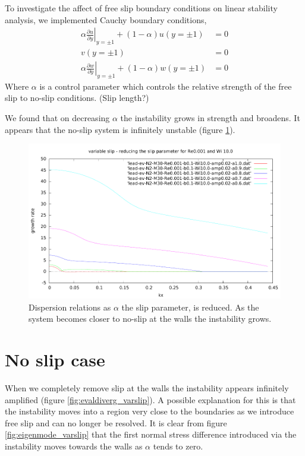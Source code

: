 \documentclass{jfm}
\newcommand{\dy}[1]{\frac{\partial #1}{\partial y}}
\begin{document}
To investigate the affect of free slip boundary conditions on linear stability analysis, we implemented Cauchy boundary conditions,
\begin{align}
    \alpha\left.\dy{u}\right|_{y=\pm1} + (1-\alpha)u(y=\pm1) &= 0 \\
    v(y=\pm1) &=0 \\
    \alpha\left.\dy{w}\right|_{y=\pm1} + (1-\alpha)w(y=\pm1) &= 0 
\end{align}
Where $\alpha$ is a control parameter which controls the relative strength of the free slip to no-slip conditions. (Slip length?)

We found that on decreasing $\alpha$ the instability grows in strength and broadens. It appears that the no-slip system is infinitely unstable (figure \ref{fig:dispersions_varslip}).

\begin{figure}
    \centering
    \includegraphics[width=\textwidth]{./figures/dispersions_varslip}
    \caption{Dispersion relations as $\alpha$ the slip parameter, is reduced. As the system becomes closer to no-slip at the walls the instability grows.}
    \label{fig:dispersions_varslip}
\end{figure}

\section{No slip case}\label{sec:variable_slip}

When we completely remove slip at the walls the instability appears infinitely amplified (figure \ref{fig:evaldiverg_varslip}). A possible explanation for this is that the instability moves into a region very close to the boundaries as we introduce free slip and can no longer be resolved. It is clear from figure \ref{fig:eigenmode_varslip} that the first normal stress difference introduced via the instability moves towards the walls as $\alpha$ tends to zero.
\end{document}
